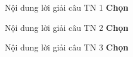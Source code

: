 \begin{loigiaiex}{1}
 Nội dung lời giải câu TN 1 \phantom {a}\hfill {\bfseries \sffamily Chọn~} 
\end{loigiaiex}
\begin{loigiaiex}{2}
 Nội dung lời giải câu TN 2 \phantom {a}\hfill {\bfseries \sffamily Chọn~} 
\end{loigiaiex}
\begin{loigiaiex}{3}
 Nội dung lời giải câu TN 3 \phantom {a}\hfill {\bfseries \sffamily Chọn~} 
\end{loigiaiex}
